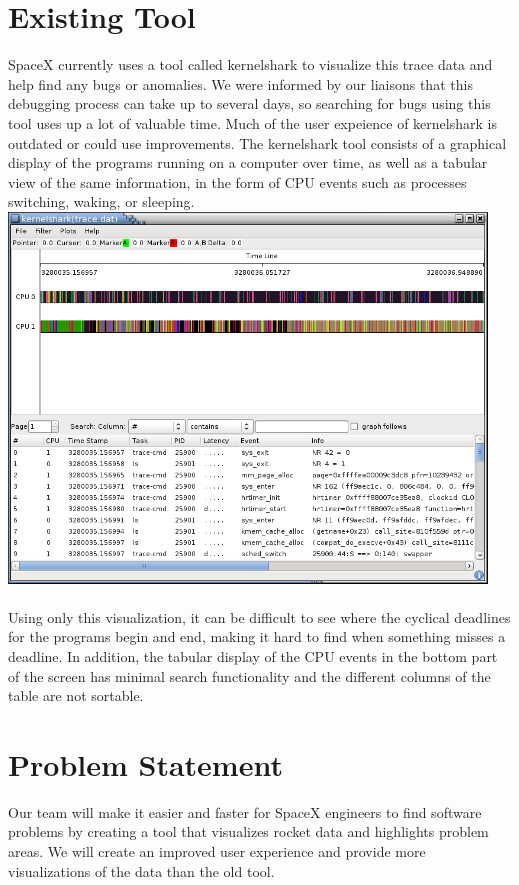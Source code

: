 \documentclass{hmcclinic}
\begin{document}
\section{Existing Tool}
SpaceX currently uses a tool called kernelshark to visualize this trace data and help find any bugs or anomalies. We were informed by our liaisons that this debugging process can take up to several days, so searching for bugs using this tool uses up a lot of valuable time. Much of the user expeience of kernelshark is outdated or could use improvements. The kernelshark tool consists of a graphical display of the programs running on a computer over time, as well as a tabular view of the same information, in the form of CPU events such as processes switching, waking, or sleeping.
\includegraphics[width=5in]{kshark-open.png}\\
\\
Using only this visualization, it can be difficult to see where the cyclical deadlines for the programs begin and end, making it hard to find when something misses a deadline. In addition, the tabular display of the CPU events in the bottom part of the screen has minimal search functionality and the different columns of the table are not sortable.

\section{Problem Statement} %
Our team will make it easier and faster for SpaceX engineers to find software problems by creating a tool that visualizes rocket data and highlights problem areas. We will create an improved user experience and provide more visualizations of the data than the old tool.
\end{document}
